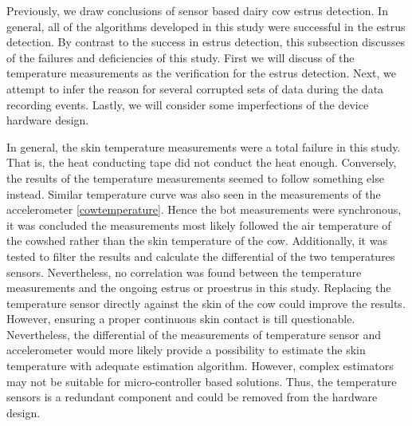 \documentclass[english,12pt,a4paper,pdftex,elec,utf8]{aaltothesis}
\begin{document}
Previously, we draw conclusions of sensor based dairy cow estrus detection. In general, all of the algorithms developed in this study were successful in the estrus detection. By contrast to the success in estrus detection, this subsection discusses of the failures and deficiencies of this study. First we will discuss of the temperature measurements as the verification for the estrus detection. Next, we attempt to infer the reason for several corrupted sets of data during the data recording events. Lastly, we will consider some imperfections of the device hardware design. 

In general, the skin temperature measurements were a total failure in this study. That is, the heat conducting tape did not conduct the heat enough. Conversely, the results of the temperature measurements seemed to follow something else instead. Similar temperature curve was also seen in the measurements of the accelerometer \ref{cowtemperature}. Hence the bot measurements were synchronous, it was concluded the measurements most likely followed the air temperature of the cowshed rather than the skin temperature of the cow. Additionally, it was tested to filter the results and calculate the differential of the two temperatures sensors. Nevertheless, no correlation was found between the temperature measurements and the ongoing estrus or proestrus in this study. Replacing the temperature sensor directly against the skin of the cow could improve the results. However, ensuring a proper continuous skin contact is till questionable. Nevertheless, the differential of the measurements of temperature sensor and accelerometer would more likely provide a possibility to estimate the skin temperature with adequate estimation algorithm. However, complex estimators may not be suitable for micro-controller based solutions. Thus, the temperature sensors is a redundant component and could be removed from the hardware design.
\end{document}
